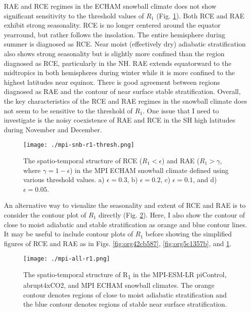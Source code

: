 \documentclass[11pt]{article}
\begin{document}
RAE and RCE regimes in the ECHAM snowball climate does not show significant sensitivity to the threshold values of \(R_1\) (Fig. \ref{fig:orgd78b48f}). Both RCE and RAE exhibit strong seasonality. RCE is no longer centered around the equator yearround, but rather follows the insolation. The entire hemisphere during summer is diagnosed as RCE. Near moist (effectively dry) adiabatic stratification also shows strong seasonality but is slightly more confined than the region diagnosed as RCE, particularly in the NH. RAE extends equatorward to the midtropics in both hemispheres during winter while it is more confined to the highest latitudes near equinox. There is good agreement between regions diagnosed as RAE and the contour of near surface stable stratification. Overall, the key characteristics of the RCE and RAE regimes in the snowball climate does not seem to be sensitive to the threshold of \(R_1\). One issue that I need to investigate is the noisy coexistence of RAE and RCE in the SH high latitudes during November and December.

\begin{figure}[htbp]
\centering
\texttt{[image: ./mpi-snb-r1-thresh.png]}
\caption{\label{fig:orgd78b48f}The spatio-temporal structure of RCE (\(R_1<\epsilon\)) and RAE (\(R_1>\gamma\), where \(\gamma=1-\epsilon\)) in the MPI ECHAM snowball climate defined using various threshold values. a) \(\epsilon=0.3\), b) \(\epsilon=0.2\), c) \(\epsilon=0.1\), and d) \(\epsilon=0.05\).}
\end{figure}

An alternative way to visualize the seasonality and extent of RCE and RAE is to consider the contour plot of \(R_1\) directly (Fig. \ref{fig:org3678aaa}). Here, I also show the contour of close to moist adiabatic and stable stratification as orange and blue contour lines. It may be useful to include contour plots of \(R_1\) before showing the simplified figures of RCE and RAE as in Figs. \ref{fig:org42cb587}, \ref{fig:org5c1357b}, and \ref{fig:orgd78b48f}.

\begin{figure}[htbp]
\centering
\texttt{[image: ./mpi-all-r1.png]}
\caption{\label{fig:org3678aaa}The spatio-temporal structure of R\textsubscript{1} in the MPI-ESM-LR piControl, abrupt4xCO2, and MPI ECHAM snowball climates. The orange contour denotes regions of close to moist adiabatic stratification and the blue contour denotes regions of stable near surface stratification.}
\end{figure}
\end{document}
